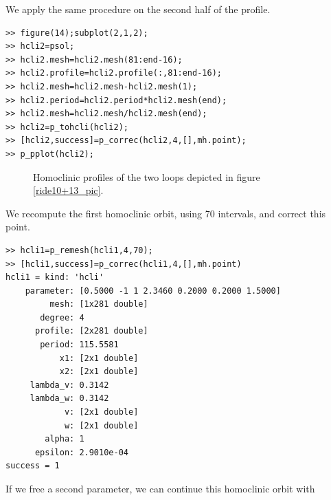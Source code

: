 \documentclass[10pt]{article}
\begin{document}
{We apply the same procedure on the second half of the profile.
{\small\begin{verbatim}
>> figure(14);subplot(2,1,2);
>> hcli2=psol;
>> hcli2.mesh=hcli2.mesh(81:end-16);
>> hcli2.profile=hcli2.profile(:,81:end-16);
>> hcli2.mesh=hcli2.mesh-hcli2.mesh(1);
>> hcli2.period=hcli2.period*hcli2.mesh(end);
>> hcli2.mesh=hcli2.mesh/hcli2.mesh(end);
>> hcli2=p_tohcli(hcli2);
>> [hcli2,success]=p_correc(hcli2,4,[],mh.point);
>> p_pplot(hcli2);
\end{verbatim}}
\begin{figure}[h]
\begin{center}
\end{center}
\caption{\small\label{ride14_pic}Homoclinic profiles of the two loops
depicted in figure \ref{ride10+13_pic}.}
\end{figure}
We recompute the first homoclinic orbit, using 70 intervals, and correct this point.
{\small\begin{verbatim}
>> hcli1=p_remesh(hcli1,4,70);
>> [hcli1,success]=p_correc(hcli1,4,[],mh.point)
hcli1 = kind: 'hcli'
    parameter: [0.5000 -1 1 2.3460 0.2000 0.2000 1.5000]
         mesh: [1x281 double]
       degree: 4
      profile: [2x281 double]
       period: 115.5581
           x1: [2x1 double]
           x2: [2x1 double]
     lambda_v: 0.3142
     lambda_w: 0.3142
            v: [2x1 double]
            w: [2x1 double]
        alpha: 1
      epsilon: 2.9010e-04
success = 1
\end{verbatim}}
If we free a second parameter, we can continue this homoclinic orbit with 
}
\end{document}
